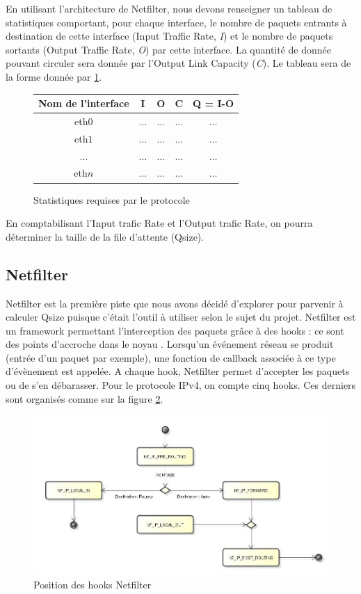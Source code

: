 \documentclass[a4paper]{article}
\begin{document}
En utilisant l'architecture de Netfilter, nous devons renseigner
un tableau de statistiques comportant, pour chaque interface, le
nombre de paquets entrants à destination de cette interface
(Input Traffic Rate, \textit{I}) et le nombre de paquets sortants
(Output Traffic Rate, \textit{O}) par cette interface. La quantité
de donnée pouvant circuler sera donnée par l'Output Link Capacity
(\textit{C}). Le tableau sera de la forme donnée par \ref{stats}.
\begin{figure}[!ht]
	\centering
	\begin{tabular}{c|c|c|c|c}
		Nom de l'interface & I & O & C & Q = I-O \\
		\hline
		eth$0$ & $\ldots$ & $\ldots$ & $\ldots$ & $\ldots$ \\
		eth$1$ & $\ldots$ & $\ldots$ & $\ldots$ & $\ldots$ \\
		$\ldots$ & $\ldots$ & $\ldots$ & $\ldots$ & $\ldots$ \\
		eth$n$ & $\ldots$ & $\ldots$ & $\ldots$ & $\ldots$ \\
	\end{tabular}
	\caption{\label{stats} Statistiques requises par le protocole}
\end{figure}

En comptabilisant l'Input trafic Rate et l'Output trafic Rate,
on pourra déterminer la taille de la file d'attente (Qsize).

\subsection{Netfilter}
Netfilter est la première piste que nous avons décidé d'explorer pour 
parvenir à calculer Qsize puisque c'était l'outil à utiliser selon le sujet du projet.
Netfilter est un framework permettant l'interception des paquets
grâce à des hooks : ce sont des points d'accroche dans le noyau \cite{netfilter1}.
Lorsqu'un événement réseau se produit (entrée d'un paquet par exemple),
une fonction de callback associée à ce type d'évènement est appelée.
A chaque hook, Netfilter permet d'accepter les paquets ou de s'en
débarasser. Pour le protocole IPv4, on compte cinq hooks. Ces derniers
sont organisés comme sur la figure \ref{hooks}.

\begin{figure}[!ht]
	\centering
	\includegraphics[scale=.5]{hooks.jpg}
	\caption{\label{hooks} Position des hooks Netfilter}
\end{figure}
\end{document}
